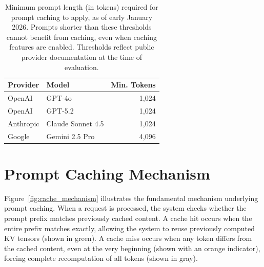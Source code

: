 \documentclass{article}
\theoremstyle{plain}
\theoremstyle{definition}
\theoremstyle{remark}
\begin{document}
\begin{table}[ht]
\centering
\small
\setlength{\tabcolsep}{4pt}
\caption{
Minimum prompt length (in tokens) required for prompt caching to apply, as of early January 2026.
Prompts shorter than these thresholds cannot benefit from caching, even when caching features are enabled.
Thresholds reflect public provider documentation at the time of evaluation. \citep{openai_prompt_caching_docs, anthropic_prompt_caching_docs, google_vertex_context_cache_overview}
}
\label{tab:caching_minimums}
\begin{tabular}{
@{}p{2.6cm} p{3.6cm}
r@{}
}
\toprule
\textbf{Provider} & \textbf{Model} &
\textbf{Min. Tokens} \\
\midrule
OpenAI
& GPT-4o
& 1,024 \\

OpenAI
& GPT-5.2
& 1,024 \\

\midrule
Anthropic
& Claude Sonnet 4.5
& 1,024 \\

\midrule
Google 
& Gemini 2.5 Pro
& 4,096 \\
\bottomrule
\end{tabular}

\vspace{0.4em}
\end{table}


\newpage
\section{Prompt Caching Mechanism}
\label{app:caching_mechanism}

Figure~\ref{fig:cache_mechanism} illustrates the fundamental mechanism underlying prompt caching. When a request is processed, the system checks whether the prompt prefix matches previously cached content. A cache hit occurs when the entire prefix matches exactly, allowing the system to reuse previously computed KV tensors (shown in green). A cache miss occurs when any token differs from the cached content, even at the very beginning (shown with an orange indicator), forcing complete recomputation of all tokens (shown in gray).
\end{document}
